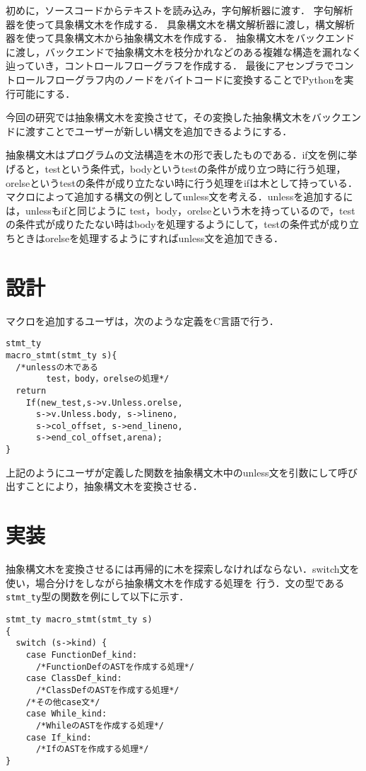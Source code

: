 \documentclass[twocolumn]{jsarticle}
\begin{document}
初めに，ソースコードからテキストを読み込み，字句解析器に渡す．
字句解析器を使って具象構文木を作成する．
具象構文木を構文解析器に渡し，構文解析器を使って具象構文木から抽象構文木を作成する．
抽象構文木をバックエンドに渡し，バックエンドで抽象構文木を枝分かれなどのある複雑な構造を漏れなく辿っていき，コントロールフローグラフを作成する．
最後にアセンブラでコントロールフローグラフ内のノードをバイトコードに変換することでPythonを実行可能にする．

今回の研究では抽象構文木を変換させて，その変換した抽象構文木をバックエンドに渡すことでユーザーが新しい構文を追加できるようにする．

抽象構文木はプログラムの文法構造を木の形で表したものである．if文を例に挙げると，testという条件式，bodyというtestの条件が成り立つ時に行う処理，orelseというtestの条件が成り立たない時に行う処理をifは木として持っている．
マクロによって追加する構文の例としてunless文を考える．unlessを追加するには，unlessもifと同じように
test，body，orelseという木を持っているので，testの条件式が成りたたない時はbodyを処理するようにして，testの条件式が成り立ちときはorelseを処理するようにすればunless文を追加できる．

\section{設計}
マクロを追加するユーザは，次のような定義をC言語で行う．

\setlength{\baselineskip}{14pt}
\begin{verbatim}
stmt_ty 
macro_stmt(stmt_ty s){
  /*unlessの木である
        test，body，orelseの処理*/
  return 
    If(new_test,s->v.Unless.orelse, 
      s->v.Unless.body, s->lineno, 
      s->col_offset, s->end_lineno, 
      s->end_col_offset,arena);
}
\end{verbatim}

上記のようにユーザが定義した関数を抽象構文木中のunless文を引数にして呼び出すことにより，抽象構文木を変換させる．

\section{実装}
抽象構文木を変換させるには再帰的に木を探索しなければならない．switch文を使い，場合分けをしながら抽象構文木を作成する処理を
行う．文の型である\verb|stmt_ty|型の関数を例にして以下に示す．
\setlength{\baselineskip}{15pt}
\begin{verbatim}
stmt_ty macro_stmt(stmt_ty s)
{
  switch (s->kind) {
    case FunctionDef_kind:
      /*FunctionDefのASTを作成する処理*/
    case ClassDef_kind:
      /*ClassDefのASTを作成する処理*/
    /*その他case文*/
    case While_kind:
      /*WhileのASTを作成する処理*/
    case If_kind:
      /*IfのASTを作成する処理*/
}
\end{verbatim}
\end{document}
